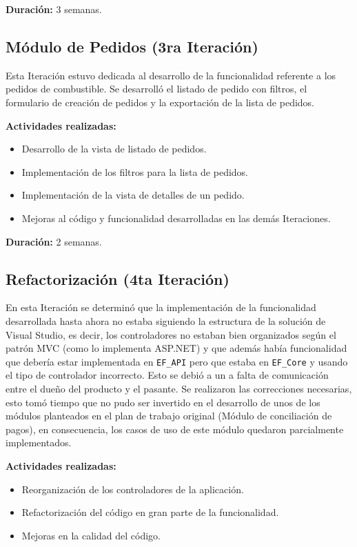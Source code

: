 \textbf{Duración:} 3 semanas.

\subsection{Módulo de Pedidos (3ra Iteración)}
Esta Iteración estuvo dedicada al desarrollo de la funcionalidad referente a los pedidos de combustible. Se desarrolló el listado de pedido con filtros, el formulario de creación de pedidos y la exportación de la lista de pedidos.

\textbf{Actividades realizadas:}
\begin{itemize}
    \item Desarrollo de la vista de listado de pedidos.
    \item Implementación de los filtros para la lista de pedidos.
    \item Implementación de la vista de detalles de un pedido.
    \item Mejoras al código y funcionalidad desarrolladas en las demás Iteraciones.
\end{itemize}

\textbf{Duración:} 2 semanas.

\subsection{Refactorización (4ta Iteración)}
En esta Iteración se determinó que la implementación de la funcionalidad desarrollada hasta ahora no estaba siguiendo la estructura de la solución de Visual Studio, es decir, los controladores no estaban bien organizados según el patrón MVC (como lo implementa ASP.NET) y que además había funcionalidad que debería estar implementada en \verb|EF_API| pero que estaba en \verb|EF_Core| y usando el tipo de controlador incorrecto. Esto se debió a un a falta de comunicación entre el dueño del producto y el pasante. Se realizaron las correcciones necesarias, esto tomó tiempo que no pudo ser invertido en el desarrollo de unos de los módulos planteados en el plan de trabajo original (Módulo de conciliación de pagos), en consecuencia, los casos de uso de este módulo quedaron parcialmente implementados.

\textbf{Actividades realizadas:}
\begin{itemize}
    \item Reorganización de los controladores de la aplicación.
    \item Refactorización del código en gran parte de la funcionalidad.
    \item Mejoras en la calidad del código.
\end{itemize}

